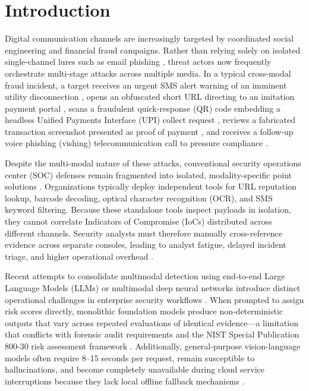 \documentclass[conference]{IEEEtran}
\begin{document}
\section{Introduction}
Digital communication channels are increasingly targeted by coordinated social engineering and financial fraud campaigns. Rather than relying solely on isolated single-channel lures such as email phishing \cite{xiang2011cantina, sonowal2020smishing}, threat actors now frequently orchestrate multi-stage attacks across multiple media. In a typical cross-modal fraud incident, a target receives an urgent SMS alert warning of an imminent utility disconnection \cite{certin2024annual}, opens an obfuscated short URL directing to an imitation payment portal \cite{marchal2014phishstorm}, scans a fraudulent quick-response (QR) code embedding a headless Unified Payments Interface (UPI) collect request \cite{vidas2013qrishing, rafsanjani2023qsecr}, reviews a fabricated transaction screenshot presented as proof of payment \cite{lin2021phishpedia, abdelnabi2020visualphishnet}, and receives a follow-up voice phishing (vishing) telecommunication call to pressure compliance \cite{kim2021vishing}.

Despite the multi-modal nature of these attacks, conventional security operations center (SOC) defenses remain fragmented into isolated, modality-specific point solutions \cite{capuano2022xai}. Organizations typically deploy independent tools for URL reputation lookup, barcode decoding, optical character recognition (OCR), and SMS keyword filtering. Because these standalone tools inspect payloads in isolation, they cannot correlate Indicators of Compromise (IoCs) distributed across different channels. Security analysts must therefore manually cross-reference evidence across separate consoles, leading to analyst fatigue, delayed incident triage, and higher operational overhead \cite{capuano2022xai, tounsi2018threatintel}.

Recent attempts to consolidate multimodal detection using end-to-end Large Language Models (LLMs) or multimodal deep neural networks introduce distinct operational challenges in enterprise security workflows \cite{wang2024surveyagents, gao2023ragsurvey}. When prompted to assign risk scores directly, monolithic foundation models produce non-deterministic outputs that vary across repeated evaluations of identical evidence—a limitation that conflicts with forensic audit requirements and the NIST Special Publication 800-30 risk assessment framework \cite{nist80030r1}. Additionally, general-purpose vision-language models often require 8--15 seconds per request, remain susceptible to hallucinations, and become completely unavailable during cloud service interruptions because they lack local offline fallback mechanisms \cite{gao2023ragsurvey}.
\end{document}
